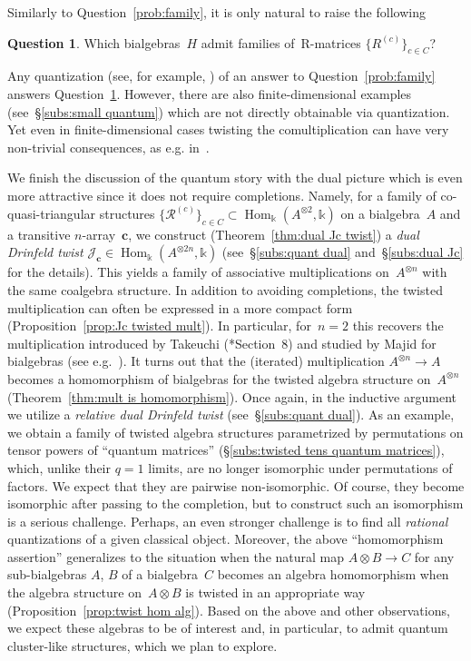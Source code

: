 \documentclass[12pt, reqno]{amsart}
\theoremstyle{definition}
\newtheorem{question}[theorem]{Question}
\numberwithin{equation}{section}
\newcommand{\tensor}{\otimes}
\newcommand{\kk}{\mathbb{k}}\newcommand{\lie}[1]{{\mathfrak{#1}}}
\DeclareMathOperator{\Hom}{Hom}
\begin{document}
Similarly to Question~\ref{prob:family}, it is only natural to raise the following
\begin{question}\label{prob:family quantum}
Which bialgebras~$H$ admit families 
of~R-matrices $\{R^{(c)}\}_{c\in C}$?
\end{question}
Any quantization (see, for example, \cites{EH,EK-I,EK-II,EK-III,Drinf-YBE}) of an answer to Question~\ref{prob:family} answers Question~\ref{prob:family quantum}. However, there are also finite-dimensional examples (see~\S\ref{subs:small quantum})
which are not directly obtainable via quantization. 
Yet even in finite-dimensional cases twisting the 
comultiplication can have very non-trivial 
consequences, as e.g. in~\cite{BB}.

We finish the discussion of the quantum story with the dual picture which is even more attractive since it does not require completions. Namely, 
for a family of co-quasi-triangular structures
$\{\mathcal R^{(c)}\}_{c\in C}\subset \Hom_\kk(A^{\tensor 2},\kk)$ on a bialgebra~$A$ and 
a transitive $n$-array~$\mathbf c$, we construct 
(Theorem~\ref{thm:dual Jc twist})
a {\em dual Drinfeld twist} $\mathcal J_{\mathbf c}\in 
\Hom_\kk(A^{\tensor 2n},\kk)$ (see~\S\ref{subs:quant dual}
and~\S\ref{subs:dual Jc}
for the details).
This yields a family of associative multiplications on~$A^{\tensor n}$ with the same coalgebra structure. 
In addition to avoiding completions, 
the twisted multiplication can often be expressed in
a more compact form (Proposition~\ref{prop:Jc twisted mult}).
In particular, for~$n=2$ this recovers the multiplication
introduced by Takeuchi (\cite{Take}*{Section~8})
and studied by Majid for bialgebras (see e.g.~\cite{Majid}). It turns out that the (iterated) multiplication
$A^{\tensor n}\to A$ becomes a homomorphism of
bialgebras for the twisted algebra structure on~$A^{\tensor n}$ (Theorem~\ref{thm:mult is homomorphism}). Once again, in the inductive argument
we utilize a {\em relative dual Drinfeld twist} (see~\S\ref{subs:quant dual}). As an example,
we obtain a family of twisted algebra structures
parametrized
by permutations on tensor powers of ``quantum matrices''  (\S\ref{subs:twisted tens quantum matrices}), which, unlike their $q=1$ limits, are 
no longer isomorphic under permutations of factors.
We expect that they are pairwise non-isomorphic.
Of course, they become isomorphic after passing to the completion, but to construct such an isomorphism is a serious challenge. Perhaps, an even stronger 
challenge is to find all {\em rational} quantizations of 
a given classical object.
Moreover, the above ``homomorphism assertion'' generalizes to the situation when the natural map $A\tensor B\to C$ for any sub-bialgebras $A$, $B$ of a bialgebra~$C$
becomes an algebra homomorphism when the algebra
structure on~$A\tensor B$ is twisted in an appropriate way
(Proposition~\ref{prop:twist hom alg}). 
Based on the above and other observations, we expect these algebras to be of interest and, in particular, to admit quantum cluster-like structures,
which we plan to explore. 
\end{document}

